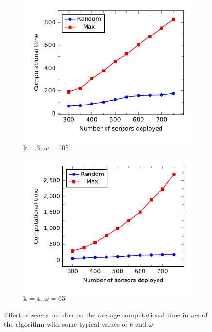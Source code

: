 %
\begin{figure}[!h]
	\begin{subfigure}{.5\textwidth}
		\centering
		\includegraphics[scale=.8]{Hinhanh/SensorNumberEffect/time/k3omega105.pdf}
		\caption{k = 3, $\omega$ = 105}
	\end{subfigure}
	\begin{subfigure}{.5\textwidth}
		\centering
		\includegraphics[scale=.8]{Hinhanh/SensorNumberEffect/time/k4omega65.pdf}
		\caption{k = 4, $\omega$ = 65}
	\end{subfigure}
\caption{Effect of sensor number on the average computational time in $ms$ of the algorithm with some typical values of $k$ and $\omega$}
\label{fig:nt}
\end{figure}
